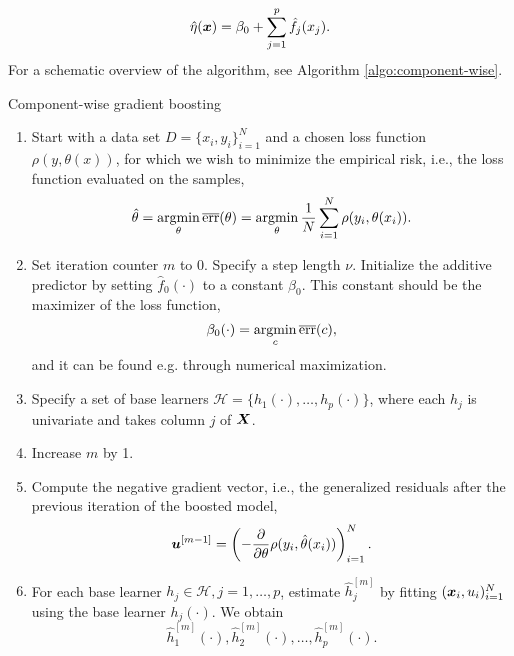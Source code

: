 \begin{equation*}
    \hat{\eta}(\bm{x})=\beta_0+\sum_{j=1}^p \hat{f}_j(x_j).
\end{equation*}
For a schematic overview of the algorithm, see Algorithm \ref{algo:component-wise}.
\begin{algorithm}
\caption{Component-wise gradient boosting}\label{algo:component-wise}
\begin{enumerate}
    \item
        Start with a data set $D=\{x_i, y_i\}_{i=1}^N$ and a chosen loss function $\rho(y,\theta(x))$, for which we wish to
        minimize the empirical risk, i.e., the loss function evaluated on the samples,
        \begin{equation*}
            \hat{\theta}=\operatorname*{argmin}_{\theta}\overline{\text{err}}(\theta)=\operatorname*{argmin}_{\theta}\frac{1}{N}\sum_{i=1}^N\rho(y_i,\theta(x_i)).
        \end{equation*}
    \item
        Set iteration counter $m$ to 0.
        Specify a step length $\nu$.
        Initialize the additive predictor by setting $\hat{f}_0(\cdot)$ to a constant $\beta_0$.
        This constant should be the maximizer of the loss function,
        \begin{equation*}
            \beta_0(\cdot)=\operatorname*{argmin}_c \overline{\text{err}}(c),
        \end{equation*}
        and it can be found e.g. through numerical maximization.
    \item
        Specify a set of base learners $\mathcal{H}=\{h_1(\cdot),\dotsc,h_p(\cdot)\}$, where each $h_j$ is univariate and takes column $j$ of $\bm{X}$.
    \item
        \label{first-step}
        Increase $m$ by 1.
    \item
        Compute the negative gradient vector, i.e., the generalized residuals after the previous iteration of the boosted model,
        \begin{equation*}
            \bm{u}^{[m-1]}=\left(-\frac{\partial}{\partial \theta}\rho(y_i, \hat{\theta}(x_i))\right)_{i=1}^N.
        \end{equation*}
    \item
        For each base learner $h_j\in\mathcal{H},j=1,\ldots,p$, estimate $\hat{h}_{j}^{[m]}$ by fitting $(\bm{x}_i,u_i)_{i=1}^N$ using the base learner $h_j(\cdot)$.
        We obtain
        \begin{equation*}
            \hat{h}_1^{[m]}(\cdot),\hat{h}_2^{[m]}(\cdot),\ldots,\hat{h}_p^{[m]}(\cdot).
        \end{equation*}

\end{enumerate}
\end{algorithm}
